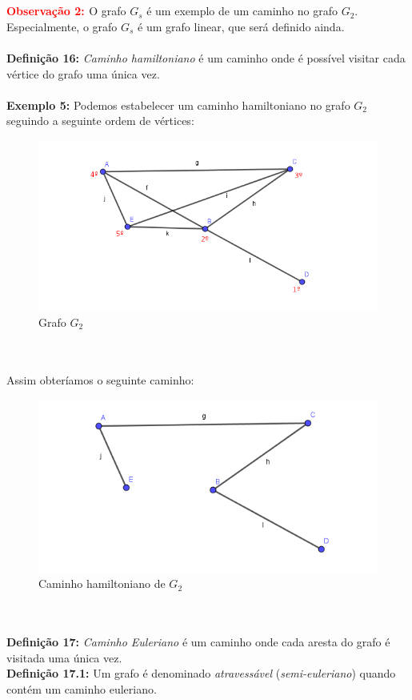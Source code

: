 \documentclass[a4paper,12pt]{article}
\begin{document}
	\\
	\\
	\textbf{\textcolor{Red}{Observação 2: }} O grafo $G_s$ é um exemplo de um caminho no grafo $G_2$. Especialmente, o grafo $G_s$ é um grafo linear, que será definido ainda.
	\\
	\\
	\textbf{Definição 16: }\textit{Caminho hamiltoniano} é um caminho onde é possível visitar cada vértice do grafo uma única vez. 
	\\
	\\
	\textbf{Exemplo 5: }Podemos estabelecer um caminho hamiltoniano no grafo $G_2$ seguindo a seguinte ordem de vértices:
	\vspace{0.5cm}
	\begin{figure}[h]
		\center
		\includegraphics[width=0.6\linewidth]{hamiltoniano.png}
		\caption{Grafo $G_2$}
		\label{}
	\end{figure}
	\\
	\\
	Assim obteríamos o seguinte caminho:
	\vspace{0.5cm}
	\begin{figure}[h]
		\center
		\includegraphics[width=0.6\linewidth]{hamiltoniano2.png}
		\caption{Caminho hamiltoniano de $G_2$}
		\label{}
	\end{figure}
	\\
	\\
	\textbf{Definição 17: }\textit{Caminho Euleriano} é um caminho onde cada aresta do grafo é visitada uma única vez.
	\\
	\textbf{Definição 17.1: }Um grafo é denominado \textit{atravessável} (\textit{semi-euleriano}) quando contém um caminho euleriano.
\end{document}
